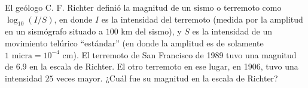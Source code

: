 \item El geólogo C. F. Richter definió la magnitud de un sismo o terremoto como $\log_{10} (I/S)$, en donde $I$ es la intensidad del terremoto (medida por la amplitud en un sismógrafo situado a $100 \text{ km}$ del sismo), y $S$ es la intensidad de un movimiento telúrico ``estándar'' (en donde la amplitud es de solamente $1 \text{ micra} = 10^{-4} \text{ cm}$). El terremoto de San Francisco de 1989 tuvo una magnitud de $6.9$ en la escala de Richter. El otro terremoto en ese lugar, en 1906, tuvo una intensidad $25$ veces mayor. ¿Cuál fue su magnitud en la escala de Richter?
